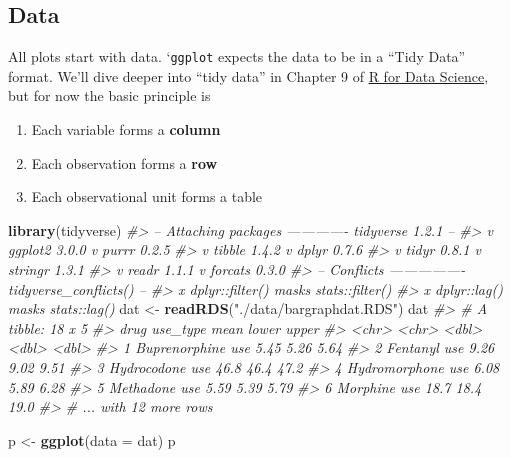\documentclass[]{book}
\newenvironment{Shaded}{\begin{snugshade}}{\end{snugshade}}
\newcommand{\KeywordTok}[1]{\textcolor[rgb]{0.13,0.29,0.53}{\textbf{#1}}}
\newcommand{\DataTypeTok}[1]{\textcolor[rgb]{0.13,0.29,0.53}{#1}}
\newcommand{\StringTok}[1]{\textcolor[rgb]{0.31,0.60,0.02}{#1}}
\newcommand{\CommentTok}[1]{\textcolor[rgb]{0.56,0.35,0.01}{\textit{#1}}}
\newcommand{\NormalTok}[1]{#1}
\providecommand{\tightlist}{%
  \setlength{\itemsep}{0pt}\setlength{\parskip}{0pt}}
\theoremstyle{definition}
\theoremstyle{definition}
\theoremstyle{definition}
\theoremstyle{remark}
\begin{document}
\subsection{Data}\label{data}

All plots start with data. `\texttt{ggplot} expects the data to be in a
``Tidy Data'' format. We'll dive deeper into ``tidy data'' in Chapter 9
of \href{}{R for Data Science}, but for now the basic principle is

\begin{enumerate}
\def\labelenumi{\arabic{enumi}.}
\tightlist
\item
  Each variable forms a \textbf{column}
\item
  Each observation forms a \textbf{row}
\item
  Each observational unit forms a table
\end{enumerate}

\begin{Shaded}
\begin{Highlighting}[]
\KeywordTok{library}\NormalTok{(tidyverse)}
\CommentTok{#> -- Attaching packages ------------- tidyverse 1.2.1 --}
\CommentTok{#> v ggplot2 3.0.0     v purrr   0.2.5}
\CommentTok{#> v tibble  1.4.2     v dplyr   0.7.6}
\CommentTok{#> v tidyr   0.8.1     v stringr 1.3.1}
\CommentTok{#> v readr   1.1.1     v forcats 0.3.0}
\CommentTok{#> -- Conflicts ---------------- tidyverse_conflicts() --}
\CommentTok{#> x dplyr::filter() masks stats::filter()}
\CommentTok{#> x dplyr::lag()    masks stats::lag()}
\NormalTok{dat <-}\StringTok{ }\KeywordTok{readRDS}\NormalTok{(}\StringTok{"./data/bargraphdat.RDS"}\NormalTok{)}
\NormalTok{dat}
\CommentTok{#> # A tibble: 18 x 5}
\CommentTok{#>   drug          use_type  mean lower upper}
\CommentTok{#>   <chr>         <chr>    <dbl> <dbl> <dbl>}
\CommentTok{#> 1 Buprenorphine use       5.45  5.26  5.64}
\CommentTok{#> 2 Fentanyl      use       9.26  9.02  9.51}
\CommentTok{#> 3 Hydrocodone   use      46.8  46.4  47.2 }
\CommentTok{#> 4 Hydromorphone use       6.08  5.89  6.28}
\CommentTok{#> 5 Methadone     use       5.59  5.39  5.79}
\CommentTok{#> 6 Morphine      use      18.7  18.4  19.0 }
\CommentTok{#> # ... with 12 more rows}
\end{Highlighting}
\end{Shaded}

\begin{Shaded}
\begin{Highlighting}[]
\NormalTok{p <-}\StringTok{ }\KeywordTok{ggplot}\NormalTok{(}\DataTypeTok{data =}\NormalTok{ dat)}
\NormalTok{p}
\end{Highlighting}
\end{Shaded}
\end{document}
